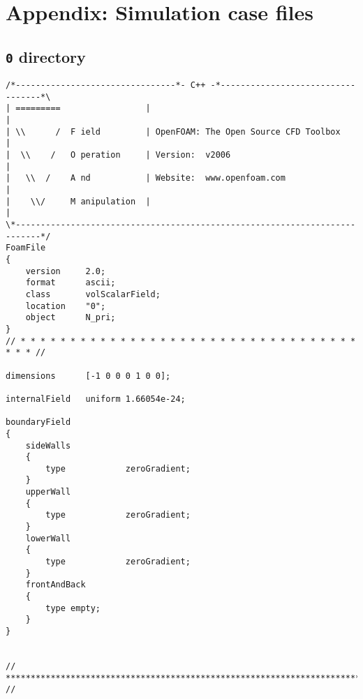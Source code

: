 \chapter{Appendix: Simulation case files}
\label{appsimfiles}

\section{\texttt{0} directory}


\begin{lstlisting}[style=cpp,title=\texttt{0/N\_pri},captionpos=t]
/*--------------------------------*- C++ -*----------------------------------*\
| =========                 |                                                 |
| \\      /  F ield         | OpenFOAM: The Open Source CFD Toolbox           |
|  \\    /   O peration     | Version:  v2006                                 |
|   \\  /    A nd           | Website:  www.openfoam.com                      |
|    \\/     M anipulation  |                                                 |
\*---------------------------------------------------------------------------*/
FoamFile
{
    version     2.0;
    format      ascii;
    class       volScalarField;
    location    "0";
    object      N_pri;
}
// * * * * * * * * * * * * * * * * * * * * * * * * * * * * * * * * * * * * * //

dimensions      [-1 0 0 0 1 0 0];

internalField   uniform 1.66054e-24;

boundaryField
{
    sideWalls
    {
        type            zeroGradient;
    }
    upperWall
    {
        type            zeroGradient;
    }
    lowerWall
    {
        type            zeroGradient;
    }
    frontAndBack
    { 
        type empty;
    }
}


// ************************************************************************* //


\end{lstlisting}


